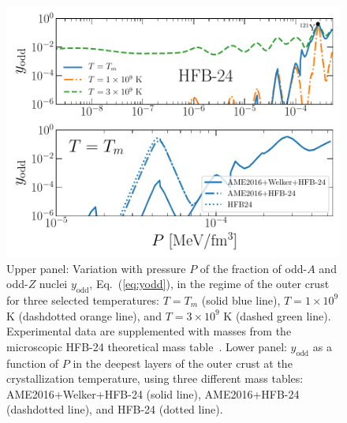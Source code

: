 \begin{figure}[!t]
  \begin{center}
    \includegraphics[width=0.9\linewidth]{figures/yodd_ocrust.pdf}
  \end{center}
  \caption[Fraction of odd-$A$ and odd-$Z$ nuclei versus pressure in the outer 
  crust regime]{
    Upper panel: Variation with pressure $P$ of the fraction of odd-$A$ and 
    odd-$Z$ nuclei $y_{\text{odd}}$, Eq.~(\ref{eq:yodd}), in the regime of the 
    outer crust for three selected
    temperatures: $T=T_m$ (solid blue line),
    $T=1\times 10^9$ \si{\kelvin} (dashdotted orange line), and 
    $T=3\times 10^9$ \si{\kelvin} (dashed green line).
    Experimental data are supplemented with masses from the microscopic 
  HFB-24 theoretical mass table~\cite{Goriely2013}. Lower panel:
$y_{\text{odd}}$ as a function of $P$ in the deepest layers of the outer crust
at the crystallization temperature, using three different mass tables:
AME2016+Welker+HFB-24 (solid line), AME2016+HFB-24 (dashdotted line), and
HFB-24 (dotted line).}\label{fig:yodd_ocrust}
\end{figure}


